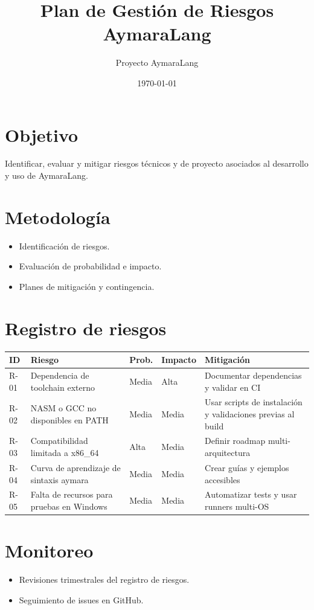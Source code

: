 \documentclass[11pt,a4paper]{article}
\title{Plan de Gestión de Riesgos\\AymaraLang}
\author{Proyecto AymaraLang}
\date{\today}
\begin{document}
\maketitle

\section{Objetivo}
Identificar, evaluar y mitigar riesgos técnicos y de proyecto asociados al desarrollo y uso de AymaraLang.

\section{Metodología}
\begin{itemize}
    \item Identificación de riesgos.
    \item Evaluación de probabilidad e impacto.
    \item Planes de mitigación y contingencia.
\end{itemize}

\section{Registro de riesgos}
\begin{longtable}{@{}p{1cm}p{5cm}p{2cm}p{2cm}p{5cm}@{}}
\toprule
\textbf{ID} & \textbf{Riesgo} & \textbf{Prob.} & \textbf{Impacto} & \textbf{Mitigación} \\ \midrule
R-01 & Dependencia de toolchain externo & Media & Alta & Documentar dependencias y validar en CI \\
R-02 & NASM o GCC no disponibles en PATH & Media & Media & Usar scripts de instalación y validaciones previas al build \\
R-03 & Compatibilidad limitada a x86\_64 & Alta & Media & Definir roadmap multi-arquitectura \\
R-04 & Curva de aprendizaje de sintaxis aymara & Media & Media & Crear guías y ejemplos accesibles \\
R-05 & Falta de recursos para pruebas en Windows & Media & Media & Automatizar tests y usar runners multi-OS \\ \bottomrule
\end{longtable}

\section{Monitoreo}
\begin{itemize}
    \item Revisiones trimestrales del registro de riesgos.
    \item Seguimiento de issues en GitHub.
\end{itemize}
\end{document}
